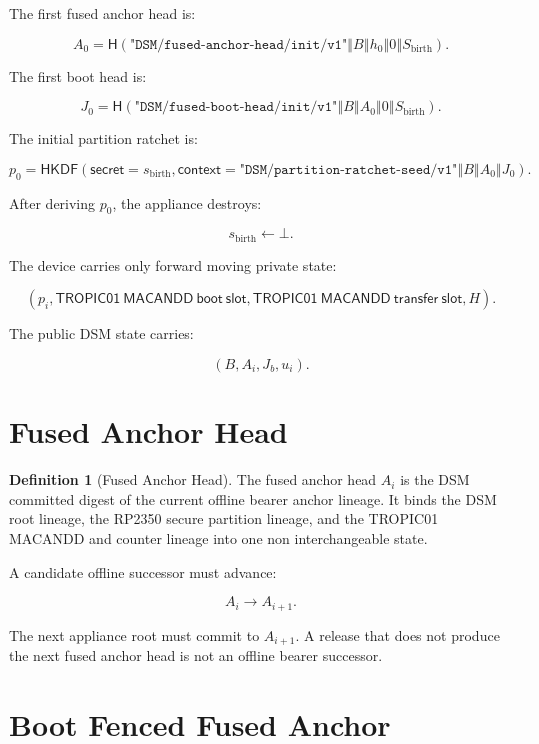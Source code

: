 \documentclass[11pt]{article}
\theoremstyle{definition}
\newtheorem{definition}[theorem]{Definition}
\theoremstyle{remark}
\newcommand{\concat}{\ensuremath{\mathbin{\Vert}}}
\newcommand{\Hf}{\ensuremath{\mathsf{H}}}
\newcommand{\HKDF}{\ensuremath{\mathsf{HKDF}}}
\newcommand{\ctx}[1]{\texttt{"#1"}}
\newcommand{\Bundle}{\ensuremath{B}}
\newcommand{\Ahead}{\ensuremath{A}}
\newcommand{\Bhead}{\ensuremath{J}}
\begin{document}
The first fused anchor head is:

\[
\Ahead_0
=
\Hf(
  \ctx{DSM/fused-anchor-head/init/v1}
  \concat \Bundle
  \concat h_0
  \concat 0
  \concat S_{\mathrm{birth}}
).
\]

The first boot head is:

\[
\Bhead_0
=
\Hf(
  \ctx{DSM/fused-boot-head/init/v1}
  \concat \Bundle
  \concat \Ahead_0
  \concat 0
  \concat S_{\mathrm{birth}}
).
\]

The initial partition ratchet is:

\[
p_0
=
\HKDF\!\left(
  \mathsf{secret}=s_{\mathrm{birth}},
  \mathsf{context}=
  \ctx{DSM/partition-ratchet-seed/v1}
  \concat \Bundle
  \concat \Ahead_0
  \concat \Bhead_0
\right).
\]

After deriving \(p_0\), the appliance destroys:

\[
s_{\mathrm{birth}}\leftarrow\bot.
\]

The device carries only forward moving private state:

\[
(
p_i,
\mathsf{TROPIC01\ MACANDD\ boot\ slot},
\mathsf{TROPIC01\ MACANDD\ transfer\ slot},
H
).
\]

The public DSM state carries:

\[
(
\Bundle,
\Ahead_i,
\Bhead_b,
u_i
).
\]

\section{Fused Anchor Head}

\begin{definition}[Fused Anchor Head]
The fused anchor head \(\Ahead_i\) is the DSM committed digest of the current offline bearer
anchor lineage. It binds the DSM root lineage, the RP2350 secure partition lineage, and the
TROPIC01 MACANDD and counter lineage into one non interchangeable state.
\end{definition}

A candidate offline successor must advance:

\[
\Ahead_i\rightarrow\Ahead_{i+1}.
\]

The next appliance root must commit to \(\Ahead_{i+1}\). A release that does not produce the next fused
anchor head is not an offline bearer successor.

\section{Boot Fenced Fused Anchor}
\end{document}
